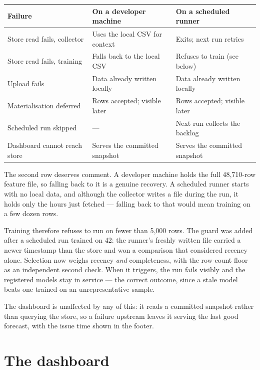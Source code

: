 \documentclass[11pt,a4paper]{article}
\begin{document}
\begin{center}
\small
\begin{tabular}{lll}
\toprule
\textbf{Failure} & \textbf{On a developer machine} & \textbf{On a scheduled runner} \\
\midrule
Store read fails, collector
  & Uses the local CSV for context
  & Exits; next run retries \\
Store read fails, training
  & Falls back to the local CSV
  & Refuses to train (see below) \\
Upload fails
  & Data already written locally
  & Data already written locally \\
Materialisation deferred
  & Rows accepted; visible later
  & Rows accepted; visible later \\
Scheduled run skipped
  & ---
  & Next run collects the backlog \\
Dashboard cannot reach store
  & Serves the committed snapshot
  & Serves the committed snapshot \\
\bottomrule
\end{tabular}
\end{center}

The second row deserves comment. A developer machine holds the full
48,710-row feature file, so falling back to it is a genuine recovery. A
scheduled runner starts with no local data, and although the collector
writes a file during the run, it holds only the hours just fetched ---
falling back to that would mean training on a few dozen rows.

Training therefore refuses to run on fewer than 5,000 rows. The guard
was added after a scheduled run trained on 42: the runner's freshly
written file carried a newer timestamp than the store and won a
comparison that considered recency alone. Selection now weighs recency
\emph{and} completeness, with the row-count floor as an independent
second check. When it triggers, the run fails visibly and the registered
models stay in service --- the correct outcome, since a stale model
beats one trained on an unrepresentative sample.

The dashboard is unaffected by any of this: it reads a committed
snapshot rather than querying the store, so a failure upstream leaves it
serving the last good forecast, with the issue time shown in the footer.

\section{The dashboard}
\end{document}
